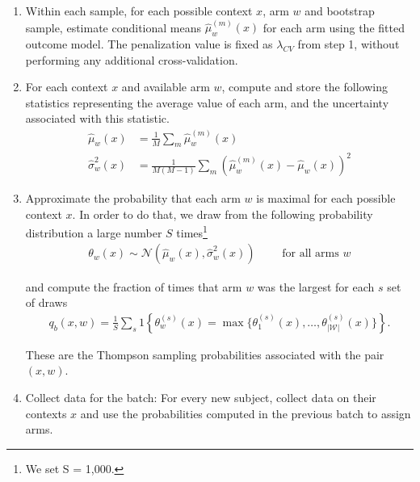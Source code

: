 \documentclass[letterpaper, 12pt, parskip=full,DIV=12]{scrartcl}
\begin{document}
\begin{enumerate}
\begin{enumerate}
  \item Within each sample, for each possible context $x$, arm $w$ and bootstrap sample, estimate conditional means  $\hat{\mu}_w^{(m)}(x)$ for each arm using the fitted outcome model. The penalization value is fixed as $\lambda_{CV}$ from step 1, without performing any additional cross-validation.
  
  \item For each context $x$ and available arm $w$, compute and store the following statistics representing the average value of each arm, and the uncertainty associated with this statistic.
    \begin{equation*}
      \begin{aligned}
        \hat{\mu}_w(x)         &= \frac{1}{M}\sum_{m} \hat{\mu}_w^{(m)}(x) \\
         \hat{\sigma}^{2}_w(x) &= \frac{1}{M(M-1)} \sum_{m} (\hat{\mu}_w^{(m)}(x) - \hat{\mu}_w(x))^2
      \end{aligned}
    \end{equation*}

  \item \label{step:prob} Approximate the probability that each arm $w$ is maximal for each possible context $x$. In order to do that, we draw from the following probability distribution a large number $S$ times\footnote{We set S = 1,000.}
  \begin{align*}
    \theta_{w}(x) \sim \mathcal{N}(\hat{\mu}_w(x), \hat{\sigma}_w^{2}(x)) \qquad %
    \text{ for all arms }w
  \end{align*}

  and compute the fraction of times that arm $w$ was the largest for each $s$ set of draws
  \begin{align*}
    q_{b}(x, w) = \frac{1}{S} \sum_{s} 1\left\{ \theta_{w}^{(s)}(x) = \max \{\theta_{1}^{(s)}(x), \dots, \theta_{|\mathcal{W}|}^{(s)}(x) \}  \right\}. 
  \end{align*}

  These are the Thompson sampling probabilities associated with the pair $(x, w)$. 
  
  \item Collect data for the batch: For every new subject, collect data on their contexts $x$ and use the probabilities computed in the previous batch to assign arms.
\end{enumerate}


\end{enumerate}
\end{document}
